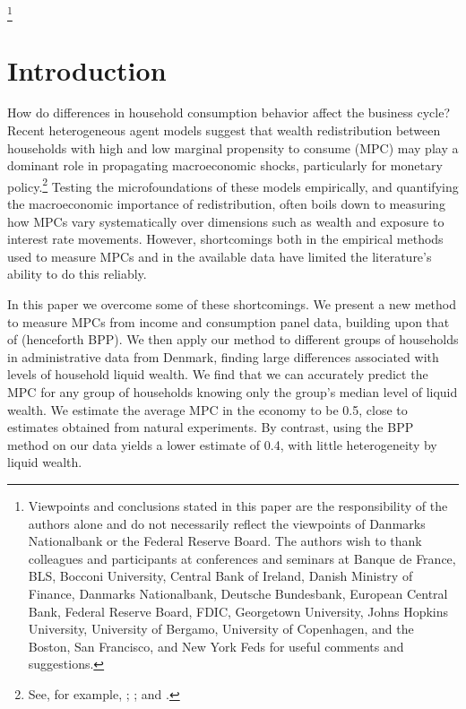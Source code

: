 \documentclass[titlepage]{\econtex}\newcommand{\texname}{ConsumptionHeterogeneity}
\begin{document}
	
	\begin{authorsinfo}
	\end{authorsinfo}
	\thanks{Viewpoints and conclusions stated in this paper are the responsibility of the authors alone and do not necessarily reflect the viewpoints of Danmarks Nationalbank or the Federal Reserve Board. The authors wish to thank colleagues and participants at conferences and seminars at Banque de France, BLS, Bocconi University, Central Bank of Ireland, Danish Ministry of Finance, Danmarks Nationalbank, Deutsche Bundesbank, European Central Bank, Federal Reserve Board, FDIC, Georgetown University, Johns Hopkins University, University of Bergamo, University of Copenhagen, and the Boston, San Francisco, and New York Feds for useful comments and suggestions.}
	
	\titlepagefinish
	\setcounter{page}{1}
	
	\pagebreak
	\section{Introduction}
	How do differences in household consumption behavior affect the business cycle? Recent heterogeneous agent models suggest that wealth redistribution between households with high and low marginal propensity to consume (MPC) may play a dominant role in propagating macroeconomic shocks, particularly for monetary policy.\footnote{See, for example, \cite{kaplan_monetary_2016}; \cite{garriga_mortgages_2017}; and \cite{greenwald_mortgage_2018}.} Testing the microfoundations of these models empirically, and quantifying the macroeconomic importance of redistribution, often boils down to measuring how MPCs vary systematically over dimensions such as wealth and exposure to interest rate movements. However, shortcomings both in the empirical methods used to measure MPCs and in the available data have limited the literature's ability to do this reliably.
	
	In this paper we overcome some of these shortcomings. We present a new method to measure MPCs from income and consumption panel data, building upon that of \cite{blundell_consumption_2008} (henceforth BPP). We then apply our method to different groups of households in administrative data from Denmark, finding large differences associated with levels of household liquid wealth. We find that we can accurately predict the MPC for any group of households knowing only the group's median level of liquid wealth.  We estimate the average MPC in the economy to be 0.5, close to estimates obtained from natural experiments. By contrast, using the BPP method on our data yields a lower estimate of 0.4, with little heterogeneity by liquid wealth.
	
\end{document}
